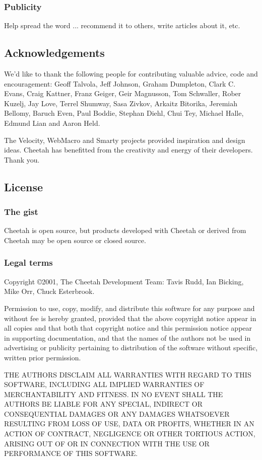 \subsubsection{Publicity}
Help spread the word ... recommend it to others, write articles about it, etc.

\subsection{Acknowledgements}
\label{intro.acknowledgments}
    
We'd like to thank the following people for contributing valuable advice, code
and encouragement: Geoff Talvola, Jeff Johnson, Graham Dumpleton, Clark C.
Evans, Craig Kattner, Franz Geiger, Geir Magnusson, Tom Schwaller, Rober Kuzelj,
Jay Love, Terrel Shumway, Sasa Zivkov, Arkaitz Bitorika, Jeremiah Bellomy,
Baruch Even, Paul Boddie, Stephan Diehl, Chui Tey, Michael Halle, Edmund Lian
and Aaron Held.
    
The Velocity, WebMacro and Smarty projects provided inspiration and design
ideas.  Cheetah has benefitted from the creativity and energy of their
developers. Thank you.

\subsection{License}
\label{intro.license}

\subsubsection{The gist}
Cheetah is open source, but products developed with Cheetah or derived
from Cheetah may be open source or closed source.

\subsubsection{Legal terms}
Copyright \copyright 2001, The Cheetah Development Team: Tavis Rudd, Ian
Bicking, Mike Orr, Chuck Esterbrook.

Permission to use, copy, modify, and distribute this software for any purpose
and without fee is hereby granted, provided that the above copyright notice
appear in all copies and that both that copyright notice and this permission
notice appear in supporting documentation, and that the names of the authors not
be used in advertising or publicity pertaining to distribution of the software
without specific, written prior permission.

THE AUTHORS DISCLAIM ALL WARRANTIES WITH REGARD TO THIS SOFTWARE, INCLUDING ALL
IMPLIED WARRANTIES OF MERCHANTABILITY AND FITNESS. IN NO EVENT SHALL THE AUTHORS
BE LIABLE FOR ANY SPECIAL, INDIRECT OR CONSEQUENTIAL DAMAGES OR ANY DAMAGES
WHATSOEVER RESULTING FROM LOSS OF USE, DATA OR PROFITS, WHETHER IN AN ACTION OF
CONTRACT, NEGLIGENCE OR OTHER TORTIOUS ACTION, ARISING OUT OF OR IN CONNECTION
WITH THE USE OR PERFORMANCE OF THIS SOFTWARE.

